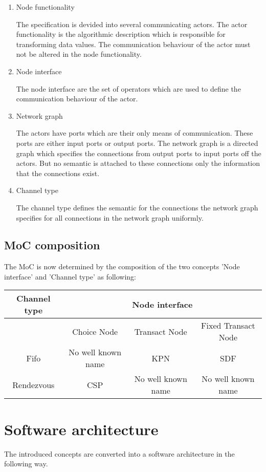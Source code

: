 \begin{enumerate}
\item Node functionality

The specification is devided into several communicating actors.
The actor functionality is the algorithmic description
which is responsible for transforming data values. The communication
behaviour of the actor must not be altered in the node functionality.

\item Node interface

The node interface are the set of operators which are used to
define the communication behaviour of the actor.

\item Network graph

The actors have ports which are their only means of communication.
These ports are either input ports or output ports.
The network graph is a directed graph which specifies the connections from
output ports to input ports off the actors.
But no semantic is attached to these connections
only the information that the connections exist.

\item
Channel type

The channel type defines the semantic for the connections
the network graph specifies for all connections in the
network graph uniformly.
\end{enumerate}

\subsection{MoC composition}

The MoC is now determined by the composition of the two concepts 'Node interface'
and 'Channel type' as following:

\begin{tabular}{|c||c|c|c|}
\hline
 Channel type & \multicolumn{3}{c|}{ Node interface } \\
\hline
              & Choice Node         & Transact Node      & Fixed Transact Node \\
\hline \hline
 Fifo         & No well known name  & KPN                & SDF \\
\hline
 Rendezvous   & CSP                 & No well known name & No well known name \\
\hline
\end{tabular}

\section{Software architecture}
The introduced concepts are converted into a software architecture in the following way.

